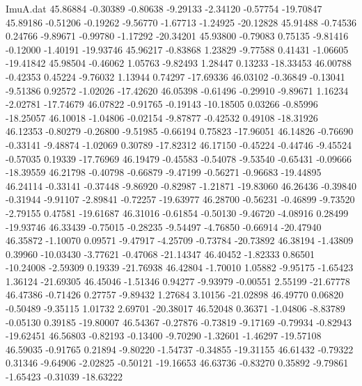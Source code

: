 \begin{filecontents}{ImuA.dat}
  45.86884   -0.30389   -0.80638   -9.29133   -2.34120   -0.57754  -19.70847
  45.89186   -0.51206   -0.19262   -9.56770   -1.67713   -1.24925  -20.12828
  45.91488   -0.74536    0.24766   -9.89671   -0.99780   -1.17292  -20.34201
  45.93800   -0.79083    0.75135   -9.81416   -0.12000   -1.40191  -19.93746
  45.96217   -0.83868    1.23829   -9.77588    0.41431   -1.06605  -19.41842
  45.98504   -0.46062    1.05763   -9.82493    1.28447    0.13233  -18.33453
  46.00788   -0.42353    0.45224   -9.76032    1.13944    0.74297  -17.69336
  46.03102   -0.36849   -0.13041   -9.51386    0.92572   -1.02026  -17.42620
  46.05398   -0.61496   -0.29910   -9.89671    1.16234   -2.02781  -17.74679
  46.07822   -0.91765   -0.19143  -10.18505    0.03266   -0.85996  -18.25057
  46.10018   -1.04806   -0.02154   -9.87877   -0.42532    0.49108  -18.31926
  46.12353   -0.80279   -0.26800   -9.51985   -0.66194    0.75823  -17.96051
  46.14826   -0.76690   -0.33141   -9.48874   -1.02069    0.30789  -17.82312
  46.17150   -0.45224   -0.44746   -9.45524   -0.57035    0.19339  -17.76969
  46.19479   -0.45583   -0.54078   -9.53540   -0.65431   -0.09666  -18.39559
  46.21798   -0.40798   -0.66879   -9.47199   -0.56271   -0.96683  -19.44895
  46.24114   -0.33141   -0.37448   -9.86920   -0.82987   -1.21871  -19.83060
  46.26436   -0.39840   -0.31944   -9.91107   -2.89841   -0.72257  -19.63977
  46.28700   -0.56231   -0.46899   -9.73520   -2.79155    0.47581  -19.61687
  46.31016   -0.61854   -0.50130   -9.46720   -4.08916    0.28499  -19.93746
  46.33439   -0.75015   -0.28235   -9.54497   -4.76850   -0.66914  -20.47940
  46.35872   -1.10070    0.09571   -9.47917   -4.25709   -0.73784  -20.73892
  46.38194   -1.43809    0.39960  -10.03430   -3.77621   -0.47068  -21.14347
  46.40452   -1.82333    0.86501  -10.24008   -2.59309    0.19339  -21.76938
  46.42804   -1.70010    1.05882   -9.95175   -1.65423    1.36124  -21.69305
  46.45046   -1.51346    0.94277   -9.93979   -0.00551    2.55199  -21.67778
  46.47386   -0.71426    0.27757   -9.89432    1.27684    3.10156  -21.02898
  46.49770    0.06820   -0.50489   -9.35115    1.01732    2.69701  -20.38017
  46.52048    0.36371   -1.04806   -8.83789   -0.05130    0.39185  -19.80007
  46.54367   -0.27876   -0.73819   -9.17169   -0.79934   -0.82943  -19.62451
  46.56803   -0.82193   -0.13400   -9.70290   -1.32601   -1.46297  -19.57108
  46.59035   -0.91765    0.21894   -9.80220   -1.54737   -0.34855  -19.31155
  46.61432   -0.79322    0.31346   -9.64906   -2.02825   -0.50121  -19.16653
  46.63736   -0.83270    0.35892   -9.79861   -1.65423   -0.31039  -18.63222

\end{filecontents}
